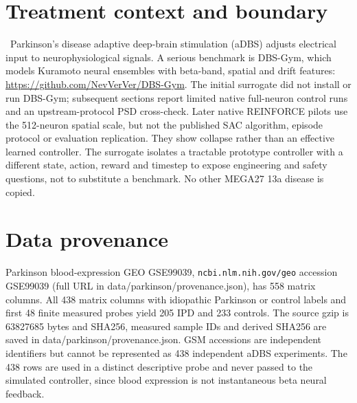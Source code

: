 \section{Treatment context and boundary}
\caution\ Parkinson's disease adaptive deep-brain stimulation (aDBS) adjusts electrical input to neurophysiological signals. A serious benchmark is DBS-Gym, which models Kuramoto neural ensembles with beta-band, spatial and drift features: \url{https://github.com/NevVerVer/DBS-Gym}. The initial surrogate did not install or run DBS-Gym; subsequent sections report limited native full-neuron control runs and an upstream-protocol PSD cross-check. Later native REINFORCE pilots use the 512-neuron spatial scale, but not the published SAC algorithm, episode protocol or evaluation replication. They show collapse rather than an effective learned controller. The surrogate isolates a tractable prototype controller with a different state, action, reward and timestep to expose engineering and safety questions, not to substitute a benchmark. No other MEGA27 13a disease is copied.
\section{Data provenance}
Parkinson blood-expression GEO GSE99039, \texttt{ncbi.nlm.nih.gov/geo} accession GSE99039 (full URL in data/parkinson/provenance.json), has 558 matrix columns. All 438 matrix columns with idiopathic Parkinson or control labels and first 48 finite measured probes yield 205 IPD and 233 controls. The source gzip is 63827685 bytes and SHA256, measured sample IDs and derived SHA256 are saved in data/parkinson/provenance.json. GSM accessions are independent identifiers but cannot be represented as 438 independent aDBS experiments. The 438 rows are used in a distinct descriptive probe and never passed to the simulated controller, since blood expression is not instantaneous beta neural feedback.
